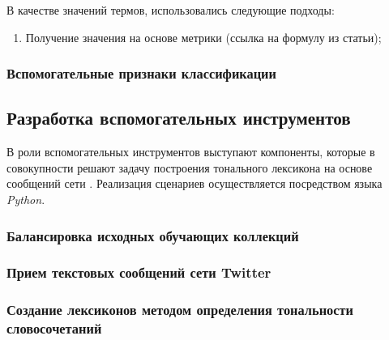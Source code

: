     В качестве значений термов, использовались следующие подходы:
    \begin{enumerate}
        \item Получение значения на основе метрики (ссылка на формулу из статьи);
    \end{enumerate}




    \subsubsection{Вспомогательные признаки классификации}

\subsection{Разработка вспомогательных инструментов}
В роли вспомогательных инструментов выступают компоненты, которые в совокупности
решают задачу построения тонального лексикона на основе сообщений сети \twitter.
Реализация сценариев осуществляется посредством языка {\it Python}.

    \subsubsection{Балансировка исходных обучающих коллекций}

    \subsubsection{Прием текстовых сообщений сети Twitter}

    \subsubsection{Создание лексиконов методом определения тональности словосочетаний}

